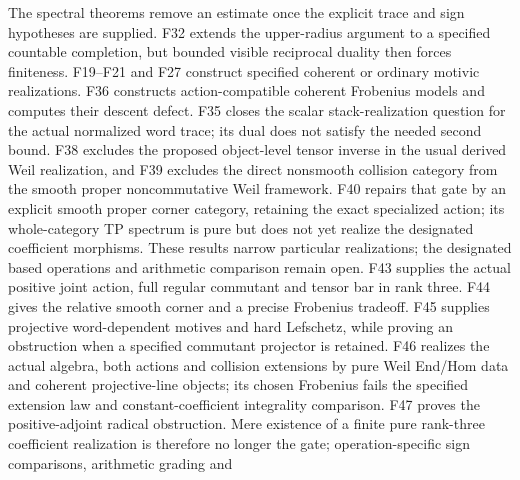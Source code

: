\documentclass[11pt,a4paper]{article}
\theoremstyle{named}\newtheorem{finding}{Finding}[section]
\theoremstyle{definition}\newtheorem{definition}[finding]{Definition}
\theoremstyle{remark}\newtheorem{remark}[finding]{Remark}
\begin{document}
The spectral theorems remove an estimate once the explicit trace and sign hypotheses are supplied. F32 extends the upper-radius argument to a specified countable completion, but bounded visible reciprocal duality then forces finiteness. F19--F21 and F27 construct specified coherent or ordinary motivic realizations. F36 constructs action-compatible coherent Frobenius models and computes their descent defect. F35 closes the scalar stack-realization question for the actual normalized word trace; its dual does not satisfy the needed second bound. F38 excludes the proposed object-level tensor inverse in the usual derived Weil realization, and F39 excludes the direct nonsmooth collision category from the smooth proper noncommutative Weil framework. F40 repairs that gate by an explicit smooth proper corner category, retaining the exact specialized action; its whole-category TP spectrum is pure but does not yet realize the designated coefficient morphisms. These results narrow particular realizations; the designated based operations and arithmetic comparison remain open.  F43 supplies the actual positive joint action, full regular
commutant and tensor bar in rank three. F44 gives the relative
smooth corner and a precise Frobenius tradeoff. F45 supplies
projective word-dependent motives and hard Lefschetz, while proving
an obstruction when a specified commutant projector is retained.
F46 realizes the actual algebra, both actions and collision
extensions by pure Weil End/Hom data and coherent projective-line
objects; its chosen Frobenius fails the specified extension law
and constant-coefficient integrality comparison. F47 proves the
positive-adjoint radical obstruction. Mere existence of a finite
pure rank-three coefficient realization is therefore no longer
the gate; operation-specific sign comparisons, arithmetic grading and
\end{document}
